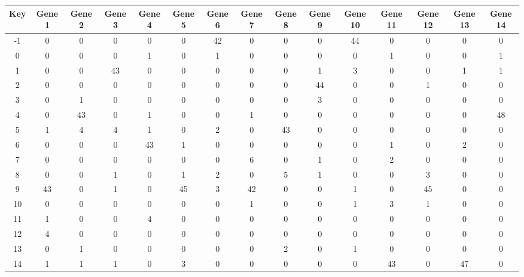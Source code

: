 \begin{tabular}{|c|c|c|c|c|c|c|c|c|c|c|c|c|c|c|}
\hline
Key & Gene 1 & Gene 2 & Gene 3 & Gene 4 & Gene 5 & Gene 6 & Gene 7 & Gene 8 & Gene 9 & Gene 10 & Gene 11 & Gene 12 & Gene 13 & Gene 14 \\
\hline
-1 & 0 & 0 & 0 & 0 & 0 & 42 & 0 & 0 & 0 & 44 & 0 & 0 & 0 & 0 \\
0 & 0 & 0 & 0 & 1 & 0 & 1 & 0 & 0 & 0 & 0 & 1 & 0 & 0 & 1 \\
1 & 0 & 0 & 43 & 0 & 0 & 0 & 0 & 0 & 1 & 3 & 0 & 0 & 1 & 1 \\
2 & 0 & 0 & 0 & 0 & 0 & 0 & 0 & 0 & 44 & 0 & 0 & 1 & 0 & 0 \\
3 & 0 & 1 & 0 & 0 & 0 & 0 & 0 & 0 & 3 & 0 & 0 & 0 & 0 & 0 \\
4 & 0 & 43 & 0 & 1 & 0 & 0 & 1 & 0 & 0 & 0 & 0 & 0 & 0 & 48 \\
5 & 1 & 4 & 4 & 1 & 0 & 2 & 0 & 43 & 0 & 0 & 0 & 0 & 0 & 0 \\
6 & 0 & 0 & 0 & 43 & 1 & 0 & 0 & 0 & 0 & 0 & 1 & 0 & 2 & 0 \\
7 & 0 & 0 & 0 & 0 & 0 & 0 & 6 & 0 & 1 & 0 & 2 & 0 & 0 & 0 \\
8 & 0 & 0 & 1 & 0 & 1 & 2 & 0 & 5 & 1 & 0 & 0 & 3 & 0 & 0 \\
9 & 43 & 0 & 1 & 0 & 45 & 3 & 42 & 0 & 0 & 1 & 0 & 45 & 0 & 0 \\
10 & 0 & 0 & 0 & 0 & 0 & 0 & 1 & 0 & 0 & 1 & 3 & 1 & 0 & 0 \\
11 & 1 & 0 & 0 & 4 & 0 & 0 & 0 & 0 & 0 & 0 & 0 & 0 & 0 & 0 \\
12 & 4 & 0 & 0 & 0 & 0 & 0 & 0 & 0 & 0 & 0 & 0 & 0 & 0 & 0 \\
13 & 0 & 1 & 0 & 0 & 0 & 0 & 0 & 2 & 0 & 1 & 0 & 0 & 0 & 0 \\
14 & 1 & 1 & 1 & 0 & 3 & 0 & 0 & 0 & 0 & 0 & 43 & 0 & 47 & 0 \\
\hline
\end{tabular}